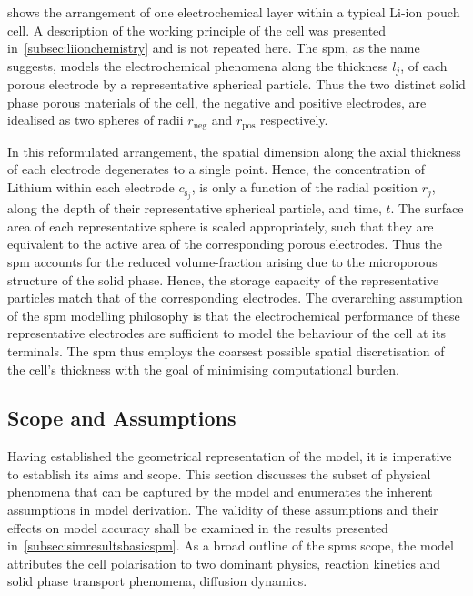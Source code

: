   shows the  arrangement  of  one electrochemical  layer
within a  typical Li-ion pouch cell.  A description of the  working principle of
the cell was presented in~\cref{subsec:liionchemistry} and is not repeated here.
The \gls{spm}, as the name  suggests, models the electrochemical phenomena along
the thickness $l_j$,  \jinnegpos{} of each porous electrode  by a representative
spherical particle.  Thus the two distinct  solid phase porous materials  of the
cell, \ie{} the  negative and positive electrodes, are idealised  as two spheres
of radii $r_\text{neg}$ and $r_\text{pos}$ respectively.


In  this  reformulated  arrangement,  the  spatial  dimension  along  the  axial
thickness  of  each  electrode  degenerates   to  a  single  point.  Hence,  the
concentration of Lithium within each electrode $c_{\text{s}_j}$, \jinnegpos{} is
only a  function of the radial  position $r_j$, \jinnegpos{} along  the depth of
their representative spherical particle, and time, $t$. The surface area of each
representative sphere is scaled appropriately,  such that they are equivalent to
the  active area  of the  corresponding  porous electrodes.  Thus the  \gls{spm}
accounts  for  the  reduced  volume-fraction  arising  due  to  the  microporous
structure of the solid phase. Hence,  the storage capacity of the representative
particles match that of the corresponding electrodes. The overarching assumption
of the \gls{spm} modelling philosophy is that the electrochemical performance of
these representative  electrodes are  sufficient to model  the behaviour  of the
cell at its terminals. The \gls{spm}  thus employs the coarsest possible spatial
discretisation of the cell's thickness with the goal of minimising computational
burden.


\subsection{Scope and Assumptions}\label{subsec:basicspmassumptions}

Having established the geometrical representation of the model, it is imperative
to  establish  its  aims  and  scope.  This  section  discusses  the  subset  of
physical  phenomena  that can  be  captured  by  the  model and  enumerates  the
inherent assumptions in model derivation.  The validity of these assumptions and
their  effects on  model accuracy  shall be  examined in  the results  presented
in~\cref{subsec:simresultsbasicspm}.  As  a  broad outline  of  the  \glspl{spm}
scope,  the model  attributes the  cell  polarisation to  two dominant  physics,
\viz{} reaction  kinetics and solid  phase transport phenomena,  \ie{} diffusion
dynamics.


